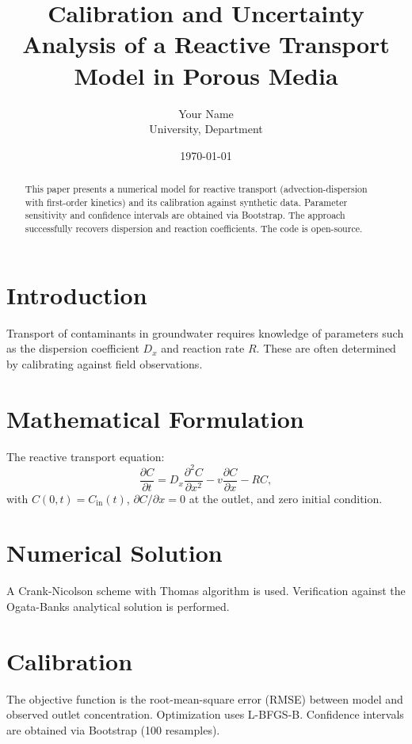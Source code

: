 \documentclass[12pt,a4paper]{article}
\title{Calibration and Uncertainty Analysis of a Reactive Transport Model in Porous Media}
\author{Your Name \\ \small{University, Department}}
\date{\today}
\begin{document}
\maketitle

\begin{abstract}
This paper presents a numerical model for reactive transport (advection-dispersion with first-order kinetics) and its calibration against synthetic data. Parameter sensitivity and confidence intervals are obtained via Bootstrap. The approach successfully recovers dispersion and reaction coefficients. The code is open-source.
\end{abstract}

\section{Introduction}
Transport of contaminants in groundwater requires knowledge of parameters such as the dispersion coefficient \(D_x\) and reaction rate \(R\). These are often determined by calibrating against field observations.

\section{Mathematical Formulation}
The reactive transport equation:
\begin{equation}
\frac{\partial C}{\partial t} = D_x \frac{\partial^2 C}{\partial x^2} - v \frac{\partial C}{\partial x} - R C,
\end{equation}
with \(C(0,t)=C_{\text{in}}(t)\), \(\partial C/\partial x=0\) at the outlet, and zero initial condition.

\section{Numerical Solution}
A Crank-Nicolson scheme with Thomas algorithm is used. Verification against the Ogata-Banks analytical solution is performed.

\section{Calibration}
The objective function is the root-mean-square error (RMSE) between model and observed outlet concentration. Optimization uses L-BFGS-B. Confidence intervals are obtained via Bootstrap (100 resamples).
\end{document}
